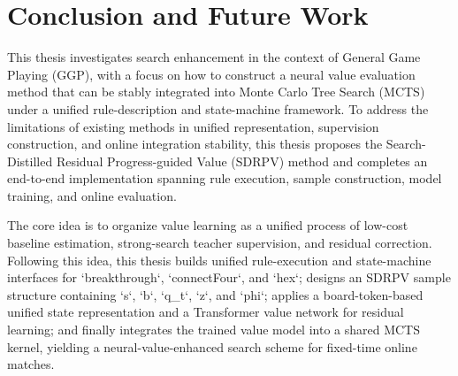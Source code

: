 ﻿%


\chapter{Conclusion and Future Work}


This thesis investigates search enhancement in the context of General Game Playing (GGP), with a focus on how to construct a neural value evaluation method that can be stably integrated into Monte Carlo Tree Search (MCTS) under a unified rule-description and state-machine framework. To address the limitations of existing methods in unified representation, supervision construction, and online integration stability, this thesis proposes the Search-Distilled Residual Progress-guided Value (SDRPV) method and completes an end-to-end implementation spanning rule execution, sample construction, model training, and online evaluation.


The core idea is to organize value learning as a unified process of low-cost baseline estimation, strong-search teacher supervision, and residual correction. Following this idea, this thesis builds unified rule-execution and state-machine interfaces for `breakthrough`, `connectFour`, and `hex`; designs an SDRPV sample structure containing `s`, `b`, `q_t`, `z`, and `phi`; applies a board-token-based unified state representation and a Transformer value network for residual learning; and finally integrates the trained value model into a shared MCTS kernel, yielding a neural-value-enhanced search scheme for fixed-time online matches.

